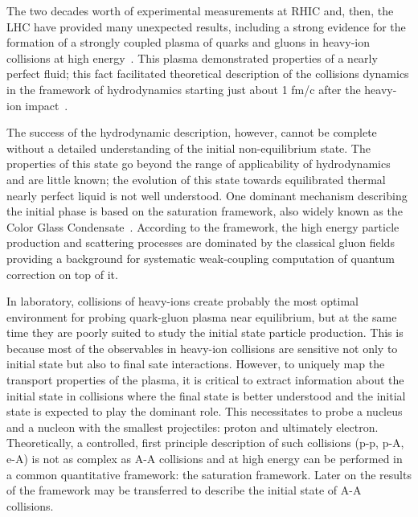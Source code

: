 The two decades worth of experimental
measurements at RHIC and, then, the LHC 
have provided many unexpected results, including 
a strong evidence for the formation of 
a strongly coupled plasma of quarks and gluons in
heavy-ion collisions at high energy~\cite{Shuryak:2003xe,Shuryak:2004cy,Adams:2005dq,Song:2010mg}. 
This plasma  
demonstrated properties of a nearly perfect fluid; 
this fact facilitated  theoretical description 
of the collisions dynamics
in the framework of hydrodynamics starting just  
about 1 fm/c after the heavy-ion impact~\cite{Schafer:2009dj,Song:2010mg,Romatschke:2017ejr}.   

The success of the hydrodynamic description, however, cannot be complete 
without a detailed understanding of the initial 
non-equilibrium state. The properties of this state go beyond the range of applicability 
of hydrodynamics and  are little known; 
the evolution of this state towards equilibrated 
thermal nearly perfect liquid  is not well understood. 
One dominant mechanism describing the initial phase is 
based on the saturation framework, also widely known as 
the Color Glass Condensate~\cite{Iancu:2002xk,Albacete:2014fwa,KovchegovLevin}. According to the framework, the 
high energy particle production and scattering processes are 
dominated by the classical gluon fields providing a 
background for systematic weak-coupling 
computation of quantum correction on top of it.  

In laboratory, 
collisions of heavy-ions create probably the most optimal envi\-ronment for 
probing quark-gluon plasma near equilibrium, but 
at the same time they are poorly suited to study the 
initial state particle production. This is because 
most of the observables in heavy-ion collisions are 
sensitive not only to  initial state but also 
to  final sate interactions. However, to uniquely map the transport properties 
of the plasma, it is critical to extract information 
about the initial state in collisions where 
the final state is better understood and the 
initial state is expected to play the dominant role.
This necessitates to probe a nucleus  and a nucleon with the smallest projectiles: 
proton and ultimately electron. 
Theoretically, a controlled,  first principle description of such collisions (p-p, p-A, e-A) 
is not as complex as A-A collisions 
and at high energy can be performed in a common quantitative framework: the saturation framework. 
Later on the results of the framework may be transferred to describe the initial state of A-A collisions. 



